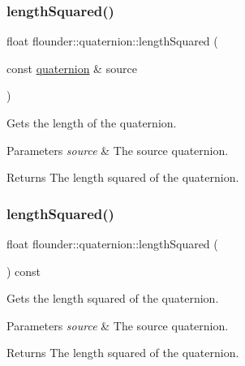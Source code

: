 \subsubsection{\texorpdfstring{length\+Squared()}{lengthSquared()}\hspace{0.1cm}{\footnotesize\ttfamily [1/2]}}
{\footnotesize\ttfamily float flounder\+::quaternion\+::length\+Squared (\begin{DoxyParamCaption}\item[{const \hyperlink{classflounder_1_1quaternion}{quaternion} \&}]{source }\end{DoxyParamCaption})\hspace{0.3cm}{\ttfamily [static]}}



Gets the length of the quaternion. 


\begin{DoxyParams}{Parameters}
{\em source} & The source quaternion. \\
\hline
\end{DoxyParams}
\begin{DoxyReturn}{Returns}
The length squared of the quaternion. 
\end{DoxyReturn}
\mbox{\label{classflounder_1_1quaternion_a63bdf3ad75e034d94b0c3dd6e26a7ce8}} 
\subsubsection{\texorpdfstring{length\+Squared()}{lengthSquared()}\hspace{0.1cm}{\footnotesize\ttfamily [2/2]}}
{\footnotesize\ttfamily float flounder\+::quaternion\+::length\+Squared (\begin{DoxyParamCaption}{ }\end{DoxyParamCaption}) const}



Gets the length squared of the quaternion. 


\begin{DoxyParams}{Parameters}
{\em source} & The source quaternion. \\
\hline
\end{DoxyParams}
\begin{DoxyReturn}{Returns}
The length squared of the quaternion. 
\end{DoxyReturn}
\mbox{\label{classflounder_1_1quaternion_a3ffb73ee7a773996fd78f428e6a0e151}} 
